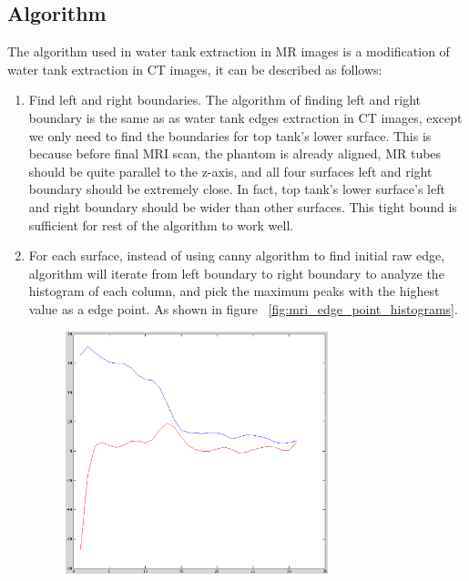 \subsection{Algorithm}

The algorithm used in water tank extraction in MR images is a modification of water tank extraction in CT
images, it can be described as follows:

\begin{enumerate}
  \item Find left and right boundaries. The algorithm of finding left and right boundary is the same as 
    as water tank edges extraction in CT images, except we only need to find the boundaries for top tank's
    lower surface. This is because before final MRI scan, the phantom is already aligned, MR tubes should 
    be quite parallel to the z-axis, and all four surfaces left and right boundary should be extremely close.
    In fact, top tank's lower surface's left and right boundary should be wider than other surfaces. This tight
    bound is sufficient for rest of the algorithm to work well.
  \item For each surface, instead of using canny algorithm to find initial raw edge, algorithm will iterate 
    from left boundary to right boundary to analyze the histogram of each column, and pick the maximum peaks
    with the highest value as a edge point. As shown in figure ~\ref{fig:mri_edge_point_histograms}.
    \begin{figure}[htb]
      \begin{center}
        \begin{minipage}[b]{3in}
          \centering
          \centerline{\mbox{\includegraphics[width=3in]{data_extraction/images/MRI/find_edge_point.eps}}}
        \end{minipage}
      \end{center}

\end{figure}
\end{enumerate}
